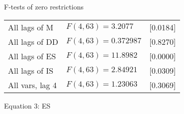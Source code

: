 \documentclass[11pt]{article}
\begin{document}
\begin{center}
F-tests of zero restrictions\\[1em]
\begin{tabular}{lll}
All lags of M & $F(4, 63) = 3.2077$ & [0.0184]\\
All lags of DD & $F(4, 63) = 0.372987$ & [0.8270]\\
All lags of ES & $F(4, 63) = 11.8982$ & [0.0000]\\
All lags of IS & $F(4, 63) = 2.84921$ & [0.0309]\\
All vars, lag 4 & $F(4, 63) = 1.23063$ & [0.3069]\\
\end{tabular}
\end{center}

\clearpage

\begin{center}

Equation 3: ES\\

\vspace{1em}


\end{center}
\end{document}
